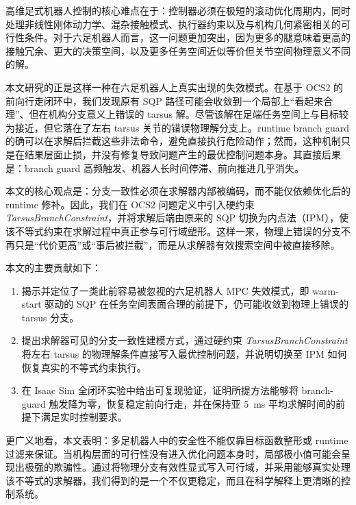 高维足式机器人控制的核心难点在于：控制器必须在极短的滚动优化周期内，同时处理非线性刚体动力学、混杂接触模式、执行器约束以及与机构几何紧密相关的可行性条件。对于六足机器人而言，这一问题更加突出，因为更多的腿意味着更高的接触冗余、更大的决策空间，以及更多任务空间近似等价但关节空间物理意义不同的解。

本文研究的正是这样一种在六足机器人上真实出现的失效模式。在基于 OCS2 的前向行走闭环中，我们发现原有 SQP 路径可能会收敛到一个局部上“看起来合理”、但在机构分支意义上错误的 tarsus 解。尽管该解在足端任务空间上与目标较为接近，但它落在了左右 tarsus 关节的错误物理解分支上。runtime branch guard 的确可以在求解后拦截这些非法命令，避免直接执行危险动作；然而，这种机制只是在结果层面止损，并没有修复导致问题产生的最优控制问题本身。其直接后果是：branch guard 高频触发、机器人长时间停滞、前向推进几乎消失。

本文的核心观点是：分支一致性必须在求解器内部被编码，而不能仅依赖优化后的 runtime 修补。因此，我们在 OCS2 问题定义中引入硬约束 \emph{TarsusBranchConstraint}，并将求解后端由原来的 SQP 切换为内点法（IPM），使该不等式约束在求解过程中真正参与可行域塑形。这样一来，物理上错误的分支不再只是“代价更高”或“事后被拦截”，而是从求解器有效搜索空间中被直接移除。

本文的主要贡献如下：
\begin{enumerate}
    \item 揭示并定位了一类此前容易被忽视的六足机器人 MPC 失效模式，即 warm-start 驱动的 SQP 在任务空间表面合理的前提下，仍可能收敛到物理上错误的 tarsus 分支。
    \item 提出求解器可见的分支一致性建模方式，通过硬约束 \emph{TarsusBranchConstraint} 将左右 tarsus 的物理解条件直接写入最优控制问题，并说明切换至 IPM 如何恢复真实的不等式约束执行。
    \item 在 Isaac Sim 全闭环实验中给出可复现验证，证明所提方法能够将 branch-guard 触发降为零，恢复稳定前向行走，并在保持亚 5~ms 平均求解时间的前提下满足实时控制要求。
\end{enumerate}

更广义地看，本文表明：多足机器人中的安全性不能仅靠目标函数整形或 runtime 过滤来保证。当机构层面的可行性没有进入优化问题本身时，局部极小值可能会呈现出极强的欺骗性。通过将物理分支有效性显式写入可行域，并采用能够真实处理该不等式的求解器，我们得到的是一个不仅更稳定，而且在科学解释上更清晰的控制系统。
